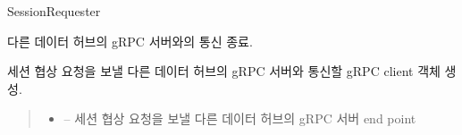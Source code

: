 \documentclass[a4paper,10pt,english]{sphinxmanual}
\begin{document}
\begin{fulllineitems}
\label{\detokenize{_SessionRequester:SessionRequester}}
\pysigstartsignatures
{}
\pysigstopsignatures
\sphinxAtStartPar
SessionRequester

\begin{fulllineitems}
\label{\detokenize{_SessionRequester:SessionRequester._closeConnection}}
\pysigstartsignatures
{}
\pysigstopsignatures
\sphinxAtStartPar
다른 데이터 허브의 {\hyperref[\detokenize{_SessionListener:sessionlistener}]{}} gRPC 서버와의 통신 종료.

\end{fulllineitems}


\begin{fulllineitems}
\label{\detokenize{_SessionRequester:SessionRequester._initConnection}}
\pysigstartsignatures
{}
\pysigstopsignatures
\sphinxAtStartPar
세션 협상 요청을 보낼 다른 데이터 허브의 {\hyperref[\detokenize{_SessionListener:sessionlistener}]{}} gRPC 서버와 통신할 gRPC client 객체 생성.
\begin{quote}\begin{description}
\begin{itemize}
\item {} 
\sphinxAtStartPar
{} – 세션 협상 요청을 보낼 다른 데이터 허브의 {\hyperref[\detokenize{_SessionListener:sessionlistener}]{}} gRPC 서버 end point

\end{itemize}


\end{description}
\end{quote}
\end{fulllineitems}
\end{fulllineitems}
\end{document}
